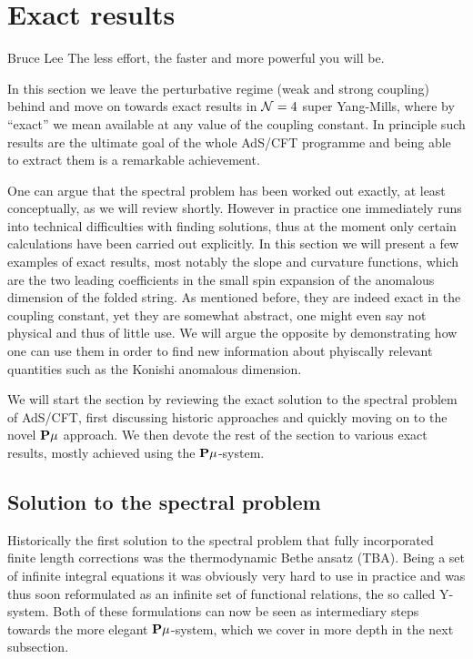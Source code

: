 
\section{Exact results}
\label{sec:exact_results}

\begin{chapquote}{Bruce Lee}
The less effort, the faster and more powerful you will be.
\end{chapquote}

\noindent In this section we leave the perturbative regime (weak and strong coupling) behind and move on towards exact results in $\mathcal{N}=4$ super Yang-Mills, where by ``exact'' we mean available at any value of the coupling constant.
In principle such results are the ultimate goal of the whole AdS/CFT programme and being able to extract them is a remarkable achievement.

One can argue that the spectral problem has been worked out exactly, at least conceptually, as we will review shortly.
However in practice one immediately runs into technical difficulties with finding solutions, thus at the moment only certain calculations have been carried out explicitly.
In this section we will present a few examples of exact results, most notably the slope and curvature functions, which are the two leading coefficients in the small spin expansion of the anomalous dimension of the folded string.
As mentioned before, they are indeed exact in the coupling constant, yet they are somewhat abstract, one might even say not physical and thus of little use.
We will argue the opposite by demonstrating how one can use them in order to find new information about phyiscally relevant quantities such as the Konishi anomalous dimension.

We will start the section by reviewing the exact solution to the spectral problem of AdS/CFT, first discussing historic approaches and quickly moving on to the novel ${\bf P}\mu$ approach.
We then devote the rest of the section to various exact results, mostly achieved using the ${\bf P}\mu$-system.


\subsection{Solution to the spectral problem}
\label{sec:tba_y_system}

Historically the first solution to the spectral problem that fully incorporated finite length corrections was the thermodynamic Bethe ansatz (TBA). 
Being a set of infinite integral equations it was obviously very hard to use in practice and was thus soon reformulated as an infinite set of functional relations, the so called Y-system.
Both of these formulations can now be seen as intermediary steps towards the more elegant ${\bf P}\mu$-system, which we cover in more depth in the next subsection.


